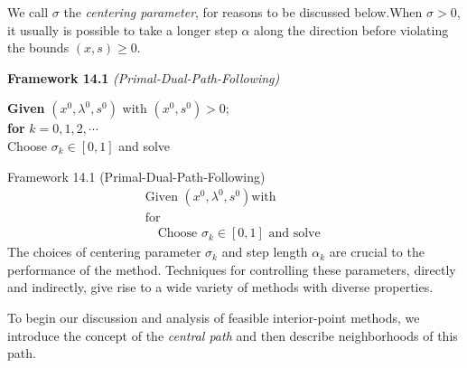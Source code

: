 We call $\sigma $ the \textit{centering parameter}, for reasons to be discussed below.When $\sigma > 0 $, it
usually is possible to take a longer step $\alpha$ along the direction before violating the bounds $(x, s)\geq 0$.
\begin{algorithm}

    \caption*{\textbf{Framework 14.1} \textit{(Primal-Dual-Path-Following)}}

    \begin{algorithmic}
        \STATE \textbf{Given} $(x^0, \lambda^0, s^0)$ with $(x^0, s^0) > 0;$\\
        \STATE \textbf{for} $k = 0, 1, 2, \cdots$ \\

        \STATE Choose $\sigma_k \in [0,1] $ and solve


    \end{algorithmic}
\end{algorithm}

Framework 14.1 (Primal-Dual-Path-Following)
\begin{align*}
    \text{Given } (x^0, \lambda^0, s^0) \text{with } \\
    \text{for }  \\
    \quad \text{Choose } \sigma_k \in [0,1] \text{ and solve }
\end{align*}
The choices of centering parameter $\sigma_k$ and step length $\alpha_k$ are crucial to the performance of the method.
Techniques for controlling these parameters, directly and indirectly, give rise to a wide variety of methods with diverse
properties.
\par To begin our discussion and analysis of feasible interior-point methods, we introduce the concept of the \textit{central path}
and then describe neighborhoods of this path.

